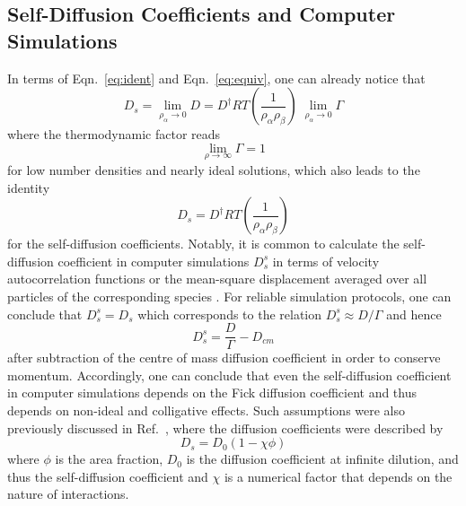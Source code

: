 \documentclass[aip,jcp,reprint]{revtex4-1}
\begin{document}
\subsection{Self-Diffusion Coefficients and Computer Simulations}
In terms of Eqn.~\eqref{eq:ident} and Eqn.~\eqref{eq:equiv}, one can already notice that 
\begin{equation}
D_{s} = \lim_{\rho_{\alpha}\rightarrow 0}D =  D^{\dag}RT\left(\frac{1}{\rho_{\alpha}\rho_{\beta}}\right)\; \lim_{\rho_{\alpha}\rightarrow 0}\Gamma
\end{equation}
where the thermodynamic factor reads
\begin{equation}
\lim_{\rho\rightarrow\infty} \Gamma = 1
\end{equation}
for low number densities and nearly ideal solutions, which also leads to the identity
\begin{equation}
D_s =  D^{\dag}RT\left(\frac{1}{\rho_{\alpha}\rho_{\beta}}\right)
\end{equation}
for the self-diffusion coefficients. 
Notably, it is common to calculate the self-diffusion coefficient in computer simulations $D_{s}^{s}$ in terms of velocity autocorrelation functions or the mean-square displacement averaged over all particles of the corresponding species \cite{allen17a}. For reliable simulation protocols, one can conclude that $D_s^{s} = D_s$ which corresponds to the relation $D_s^{s} \approx D/\Gamma$ and hence
\begin{equation}
\label{eq:tracerdiff}
D_s^{s} = \frac{D}{\Gamma} - D_{cm}
\end{equation}
after subtraction of the centre of mass diffusion coefficient in order to conserve momentum. Accordingly, one can conclude that even the self-diffusion coefficient in computer simulations depends on the Fick diffusion coefficient and thus depends on non-ideal and colligative effects. 
Such assumptions were also previously discussed in Ref.~, where the diffusion coefficients were described by
\begin{equation}
D_s = D_0(1-\chi\phi)
\end{equation}
where $\phi$ is the area fraction, $D_0$ is the diffusion coefficient at infinite dilution, and thus the self-diffusion coefficient and $\chi$ is a numerical factor that depends on the nature of interactions. 
\end{document}
